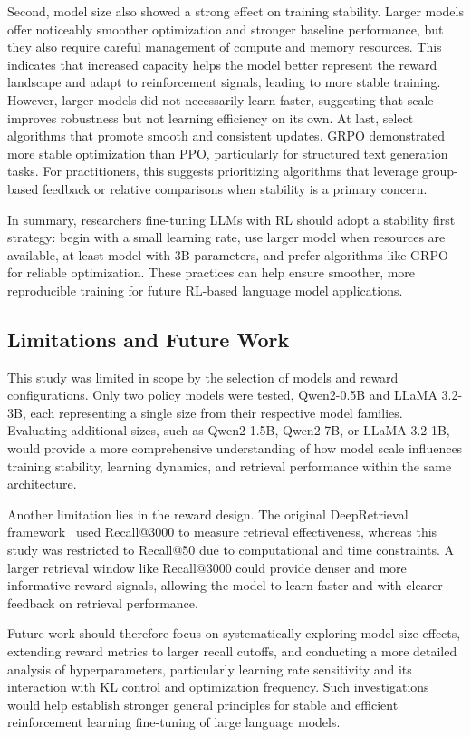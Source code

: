 Second, model size also showed a strong effect on training stability. Larger models offer noticeably smoother optimization and stronger baseline performance, but they also require careful management of compute and memory resources. This indicates that increased capacity helps the model better represent the reward landscape and adapt to reinforcement signals, leading to more stable training. However, larger models did not necessarily learn faster, suggesting that scale improves robustness but not learning efficiency on its own. At last, select algorithms that promote smooth and consistent updates. GRPO demonstrated more stable optimization than PPO, particularly for structured text generation tasks. For practitioners, this suggests prioritizing algorithms that leverage group-based feedback or relative comparisons when stability is a primary concern.

In summary, researchers fine-tuning LLMs with RL should adopt a stability first strategy: begin with a small learning rate, use larger model when resources are available, at least model with 3B parameters, and prefer algorithms like GRPO for reliable optimization. These practices can help ensure smoother, more reproducible training for future RL-based language model applications.

\subsection{Limitations and Future Work}
This study was limited in scope by the selection of models and reward configurations. Only two policy models were tested, Qwen2-0.5B and LLaMA 3.2-3B, each representing a single size from their respective model families. Evaluating additional sizes, such as Qwen2-1.5B, Qwen2-7B, or LLaMA 3.2-1B, would provide a more comprehensive understanding of how model scale influences training stability, learning dynamics, and retrieval performance within the same architecture.

Another limitation lies in the reward design. The original DeepRetrieval framework~\cite{jiang2025deepretrieval} used Recall@3000 to measure retrieval effectiveness, whereas this study was restricted to Recall@50 due to computational and time constraints. A larger retrieval window like Recall@3000 could provide denser and more informative reward signals, allowing the model to learn faster and with clearer feedback on retrieval performance.

Future work should therefore focus on systematically exploring model size effects, extending reward metrics to larger recall cutoffs, and conducting a more detailed analysis of hyperparameters, particularly learning rate sensitivity and its interaction with KL control and optimization frequency. Such investigations would help establish stronger general principles for stable and efficient reinforcement learning fine-tuning of large language models.